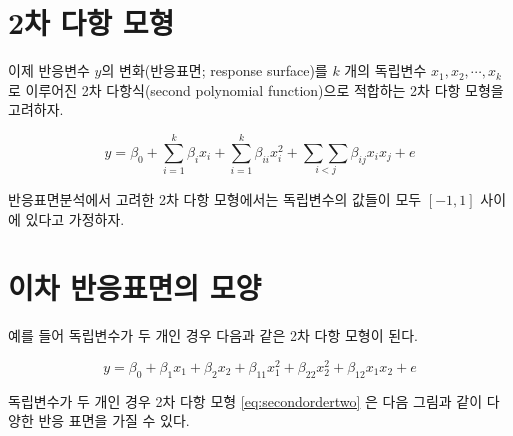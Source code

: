 \documentclass[
]{book}
\makeatletter
\newenvironment{kframe}{%
\medskip{}
\setlength{\fboxsep}{.8em}
 \def\at@end@of@kframe{}%
 \ifinner\ifhmode%
  \def\at@end@of@kframe{\end{minipage}}%
  \begin{minipage}{\columnwidth}%
 \fi\fi%
 \def\FrameCommand##1{\hskip\@totalleftmargin \hskip-\fboxsep
 \colorbox{shadecolor}{##1}\hskip-\fboxsep
     \hskip-\linewidth \hskip-\@totalleftmargin \hskip\columnwidth}%
 \MakeFramed {\advance\hsize-\width
   \@totalleftmargin\z@ \linewidth\hsize
   \@setminipage}}%
 {\par\unskip\endMakeFramed%
 \at@end@of@kframe}
\newenvironment{rmdblock}[1]
  {
  \begin{itemize}
  \renewcommand{\labelitemi}{
    \raisebox{-.7\height}[0pt][0pt]{
      {\setkeys{Gin}{width=3em,keepaspectratio}\texttt{[image: images/\#1]}}
    }
  }
  \setlength{\fboxsep}{1em}
  \begin{kframe}
  \item
  }
  {
  \end{kframe}
  \end{itemize}
  }
\newenvironment{rmdnote}
  {\begin{rmdblock}{note}}
  {\end{rmdblock}}
\theoremstyle{definition}
\theoremstyle{definition}
\theoremstyle{definition}
\theoremstyle{definition}
\theoremstyle{remark}
\makeatother
\begin{document}
\hypertarget{uxcc28-uxb2e4uxd56d-uxbaa8uxd615}{%
\section{2차 다항 모형}\label{uxcc28-uxb2e4uxd56d-uxbaa8uxd615}}

이제 반응변수 \(y\)의 변화(반응표면; response surface)를 \(k\) 개의 독립변수 \(x_1, x_2, \cdots, x_k\) 로 이루어진 2차 다항식(second polynomial function)으로 적합하는 2차 다항 모형을 고려하자.

\begin{equation}
y = \beta_0 + \sum_{i=1}^{k} \beta_i x_i + \sum_{i=1}^{k} \beta_{ii} x^2_i + \underset{i<j}{\sum \sum} \beta_{ij} x_i x_j +e
\label{eq:secondorder}
\end{equation}

\begin{rmdnote}
반응표면분석에서 고려한 2차 다항 모형에서는 독립변수의 값들이 모두 \([-1,1]\) 사이에 있다고 가정하자.
\end{rmdnote}

\hypertarget{uxc774uxcc28-uxbc18uxc751uxd45cuxba74uxc758-uxbaa8uxc591}{%
\section{이차 반응표면의 모양}\label{uxc774uxcc28-uxbc18uxc751uxd45cuxba74uxc758-uxbaa8uxc591}}

예를 들어 독립변수가 두 개인 경우 다음과 같은 2차 다항 모형이 된다.

\begin{equation}
y = \beta_0 + \beta_1 x_1  + \beta_2 x_2 + \beta_{11} x_1^2 + \beta_{22} x_2^2 + \beta_{12} x_1 x_2 + e
\label{eq:secondordertwo}
\end{equation}

독립변수가 두 개인 경우 2차 다항 모형 \eqref{eq:secondordertwo} 은 다음 그림과 같이 다양한 반응 표면을 가질 수 있다.
\end{document}
